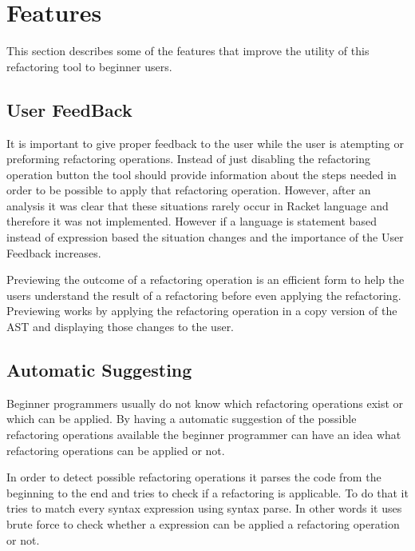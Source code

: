 \section{Features}
This section describes some of the features that improve the utility of this
refactoring tool to beginner users. %
\subsection{User FeedBack}
It is important to give proper feedback to the user while the user is atempting or
 preforming refactoring operations.
Instead of just disabling the refactoring operation button the tool should
 provide information about the steps needed in order to be possible to apply
 that refactoring operation.
However, after an analysis it was clear that these situations rarely occur
in Racket language and therefore it was not implemented.
However if a language is statement based instead of expression based the situation changes
and the importance of the User Feedback increases. %

Previewing the outcome of a refactoring operation is an efficient form to
help the users understand the result of a refactoring before even applying the refactoring. %
Previewing works by applying the refactoring operation in a copy version of the AST
and displaying those changes to the user.


\subsection{Automatic Suggesting}
Beginner programmers usually do not know which refactoring operations exist or
which can be applied. 
By having a automatic suggestion of the possible refactoring operations available
 the beginner programmer can have an idea what refactoring operations can be
 applied or not.

In order to detect possible refactoring operations it parses the code from the
beginning to the end and tries to check if a refactoring is applicable.
To do that it tries to match every syntax expression using syntax parse.
In other words it uses brute force to check whether a expression can be applied
a refactoring operation or not.

